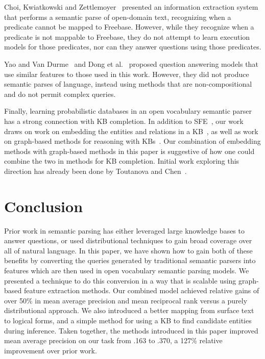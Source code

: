 \documentclass[11pt,letterpaper]{article}
\begin{document}
Choi, Kwiatkowski and Zettlemoyer~
presented an information extraction system that performs a semantic parse of open-domain text,
recognizing when a predicate cannot be mapped to Freebase.  However, while they recognize when a
predicate is not mappable to Freebase, they do not attempt to learn execution models for those
predicates, nor can they answer questions using those predicates.

Yao and Van Durme~ and Dong et
al.~ proposed question answering models that use similar
features to those used in this work.  However, they did not produce semantic parses of language,
instead using methods that are non-compositional and do not permit complex queries.

Finally, learning probabilistic databases in an open vocabulary semantic parser has a strong
connection with KB completion.  In addition to SFE~\cite{gardner-2015-sfe}, our work draws on work
on embedding the entities and relations in a
KB~\cite{riedel-2013-mf-universal-schema,nickel-2011-rescal,%
bordes-2013-transe,nickel-2014-are,toutanova-2015-joint-text-kb-embedding}, as well as work on
graph-based methods for reasoning with
KBs~\cite{lao-2010-original-pra,gardner-2014-vector-space-pra,neelakantan-2015-rnn-kbc,%
bornea-2015-relational-path-mining}.  Our combination of embedding methods with graph-based methods
in this paper is suggestive of how one could combine the two in methods for KB completion.  Initial
work exploring this direction has already been done by Toutanova and
Chen~.


\vspace{-3.50mm}
\section{Conclusion}
\label{sec:conclusion}

Prior work in semantic parsing has either leveraged large knowledge bases to answer questions, or
used distributional techniques to gain broad coverage over all of natural language.  In this paper,
we have shown how to gain both of these benefits by converting the queries generated by traditional
semantic parsers into features which are then used in open vocabulary semantic parsing models.  We
presented a technique to do this conversion in a way that is scalable using graph-based feature
extraction methods.  Our combined model achieved relative gains of over 50\% in mean average
precision and mean reciprocal rank versus a purely distributional approach.  We also introduced a
better mapping from surface text to logical forms, and a simple method for using a KB to find
candidate entities during inference.  Taken together, the methods introduced in this paper improved
mean average precision on our task from .163 to .370, a 127\% relative improvement over prior work.
\end{document}

